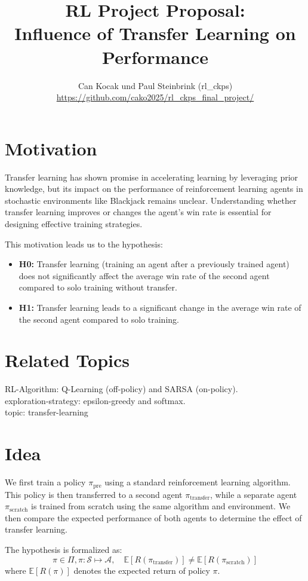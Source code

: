 \documentclass{article}
\title{{\large RL Project Proposal:}\\

Influence of Transfer Learning on Performance}
\author{Can Kocak und Paul Steinbrink (rl\_ckps) \\ \url{https://github.com/cako2025/rl_ckps_final_project/}}
\begin{document}
\maketitle
\section{Motivation}
Transfer learning has shown promise in accelerating learning by leveraging prior knowledge, but its impact on the performance of reinforcement learning agents in stochastic environments like Blackjack remains unclear. Understanding whether transfer learning improves or changes the agent's win rate is essential for designing effective training strategies.

This motivation leads us to the hypothesis:
\begin{itemize}
    \item \textbf{H0:} Transfer learning (training an agent after a previously trained agent) does not significantly affect the average win rate of the second agent compared to solo training without transfer.
    \item \textbf{H1:} Transfer learning leads to a significant change in the average win rate of the second agent compared to solo training.
\end{itemize}


\section{Related Topics}
RL-Algorithm: Q-Learning (off-policy) and SARSA (on-policy).\\
exploration-strategy: epsilon-greedy and softmax.\\
topic: transfer-learning

\section{Idea}
We first train a policy $\pi_{\text{pre}}$ using a standard reinforcement learning algorithm. 
This policy is then transferred to a second agent $\pi_{\text{transfer}}$, while a separate agent 
$\pi_{\text{scratch}}$ is trained from scratch using the same algorithm and environment. 
We then compare the expected performance of both agents to determine the effect of transfer learning.

The hypothesis is formalized as:
\begin{equation}
    \label{eq:hypothesis}
    \pi \in \Pi, \pi: \mathcal{S} \mapsto \mathcal{A}, \quad \mathbb{E}[R(\pi_{\text{transfer}})] \neq \mathbb{E}[R(\pi_{\text{scratch}})]
\end{equation}
where $\mathbb{E}[R(\pi)]$ denotes the expected return of policy $\pi$.
\end{document}
